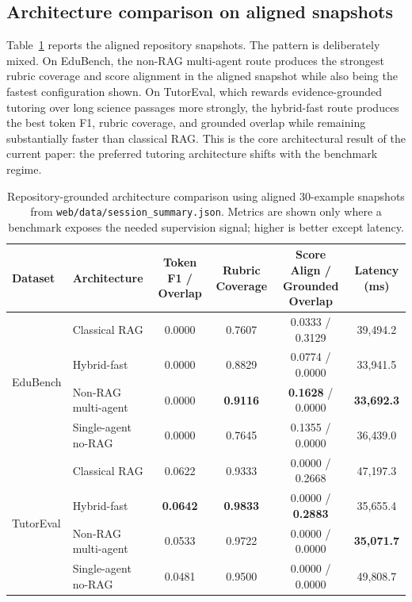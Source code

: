 \subsection{Architecture comparison on aligned snapshots}

Table~\ref{tab:main} reports the aligned repository snapshots. The pattern is deliberately mixed. On EduBench, the non-RAG multi-agent route produces the strongest rubric coverage and score alignment in the aligned snapshot while also being the fastest configuration shown. On TutorEval, which rewards evidence-grounded tutoring over long science passages more strongly, the hybrid-fast route produces the best token F1, rubric coverage, and grounded overlap while remaining substantially faster than classical RAG. This is the core architectural result of the current paper: the preferred tutoring architecture shifts with the benchmark regime.

\begin{table}[t]
\caption{Repository-grounded architecture comparison using aligned 30-example snapshots from \texttt{web/data/session\_summary.json}. Metrics are shown only where a benchmark exposes the needed supervision signal; higher is better except latency.}
\label{tab:main}
\centering
\scriptsize
\begin{tabular}{llcccc}
\toprule
Dataset & Architecture & Token F1 / Overlap & Rubric Coverage & Score Align / Grounded Overlap & Latency (ms) \\
\midrule
\multirow{4}{*}{EduBench}
& Classical RAG & 0.0000 & 0.7607 & 0.0333 / 0.3129 & 39{,}494.2 \\
& Hybrid-fast & 0.0000 & 0.8829 & 0.0774 / 0.0000 & 33{,}941.5 \\
& Non-RAG multi-agent & 0.0000 & \textbf{0.9116} & \textbf{0.1628} / 0.0000 & \textbf{33{,}692.3} \\
& Single-agent no-RAG & 0.0000 & 0.7645 & 0.1355 / 0.0000 & 36{,}439.0 \\
\midrule
\multirow{4}{*}{TutorEval}
& Classical RAG & 0.0622 & 0.9333 & 0.0000 / 0.2668 & 47{,}197.3 \\
& Hybrid-fast & \textbf{0.0642} & \textbf{0.9833} & 0.0000 / \textbf{0.2883} & 35{,}655.4 \\
& Non-RAG multi-agent & 0.0533 & 0.9722 & 0.0000 / 0.0000 & \textbf{35{,}071.7} \\
& Single-agent no-RAG & 0.0481 & 0.9500 & 0.0000 / 0.0000 & 49{,}808.7 \\
\bottomrule
\end{tabular}
\end{table}

